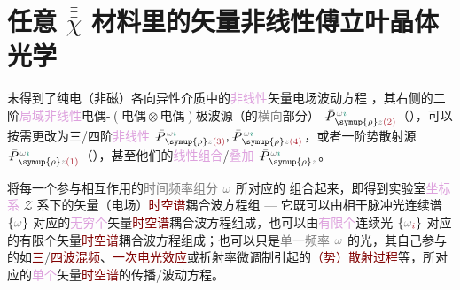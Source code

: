 
\chapter{任意 \texorpdfstring{$\bar{\bar{\bar{\chi}}}$}{$\bar{\bar{\bar{\text{χ}}}}$} 材料里的矢量非线性傅立叶晶体光学}\label{chap:NFCO}
\noindent{}
\vspace{-\baselineskip} %

 末得到了\textcolor{PineGreen}{纯电（非磁）各向异性}介质中的\textcolor{Plum}{非线性}矢量电场波动方程 ，其右侧的二阶\textcolor{Plum}{局域}\textcolor{Plum}{非线性}\textcolor{NavyBlue}{电偶-$(\text{电偶}\otimes\text{电偶})$}极\textcolor{NavyBlue}{波源}（的\textcolor{gray}{横向}部分） $\xint{\mathcolor{gray}{-}}{25}{\bar{P}}^{\;\! \mathcolor{gray}{\omega} \textcolor{PineGreen}{\imath}}_{\;\! \symup{\rho} \mathcolor{gray}{z} \textcolor{Maroon}{(2)}}$（），可以按需更改为三/四阶\textcolor{Plum}{非线性} $\xint{\mathcolor{gray}{-}}{25}{\bar{P}}^{\;\! \mathcolor{gray}{\omega} \textcolor{PineGreen}{\imath}}_{\;\! \symup{\rho} \mathcolor{gray}{z} \textcolor{Maroon}{(3)}}, \xint{\mathcolor{gray}{-}}{25}{\bar{P}}^{\;\! \mathcolor{gray}{\omega} \textcolor{PineGreen}{\imath}}_{\;\! \symup{\rho} \mathcolor{gray}{z} \textcolor{Maroon}{(4)}}$，或者一阶\textcolor{NavyBlue}{势散射源} $\xint{\mathcolor{gray}{-}}{25}{\bar{P}}^{\;\! \mathcolor{gray}{\omega} \textcolor{PineGreen}{\imath}}_{\;\! \symup{\rho} \mathcolor{gray}{z} \textcolor{Maroon}{(1)}}$（），甚至他们的\textcolor{Plum}{线性组合}/\textcolor{Plum}{叠加} $\xint{\mathcolor{gray}{-}}{25}{\bar{P}}^{\;\! \mathcolor{gray}{\omega} \textcolor{PineGreen}{\imath}}_{\;\! \symup{\rho} \mathcolor{gray}{z}}$。

将每一个参与相互作用的\textcolor{gray}{时间频率组分} $\mathcolor{gray}{\omega}$ 所对应的  组合起来，即得到\textcolor{PineGreen}{实验室}\textcolor{Plum}{坐标系} \textcolor{PineGreen}{$\mathcal{Z}$ 系}下的矢量（电场）\textcolor{Maroon}{时空谱}耦合波方程组 --- 它既可以由相干\textcolor{NavyBlue}{脉冲光连续谱} $\left\{ \mathcolor{gray}{\omega} \right\}$ 对应的\textcolor{Plum}{无穷个}矢量\textcolor{Maroon}{时空谱}耦合波方程组成，也可以由\textcolor{Plum}{有限个}\textcolor{NavyBlue}{连续光} $\left\{ \mathcolor{gray}{\omega}_{\textcolor{Maroon}{i}} \right\}$ 对应的有限个矢量\textcolor{Maroon}{时空谱}耦合波方程组成；也可以只是\textcolor{gray}{单一频率} $\mathcolor{gray}{\omega}$ 的光，其自己参与的如\textcolor{Maroon}{三}/\textcolor{Maroon}{四波混频}、\textcolor{Maroon}{一次电光效应}或\textcolor{PineGreen}{折射率微调制}引起的\textcolor{Maroon}{（势）散射过程}等，所对应的\textcolor{Plum}{单个}矢量\textcolor{Maroon}{时空谱}的传播/波动方程。

